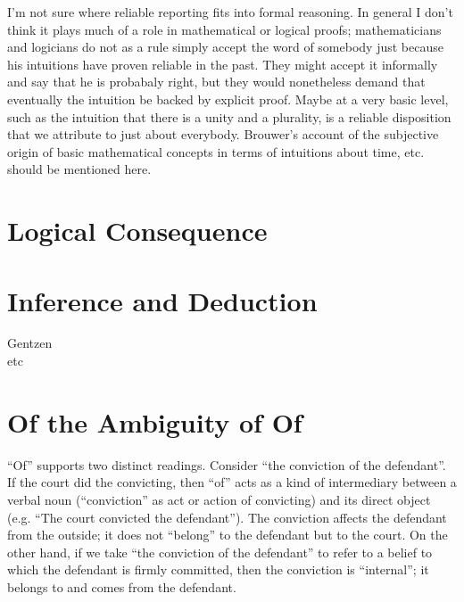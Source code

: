 \begin{ednote}
  I'm not sure where reliable reporting fits into formal reasoning.
  In general I don't think it plays much of a role in mathematical or
  logical proofs; mathematicians and logicians do not as a rule simply
  accept the word of somebody just because his intuitions have proven
  reliable in the past.  They might accept it informally and say that
  he is probabaly right, but they would nonetheless demand that
  eventually the intuition be backed by explicit proof.  Maybe at a
  very basic level, such as the intuition that there is a unity and a
  plurality, is a reliable disposition that we attribute to just about
  everybody.  Brouwer's account of the subjective origin of basic
  mathematical concepts in terms of intuitions about time, etc. should
  be mentioned here.
\end{ednote}

\section{Logical Consequence}
\label{subs:logconseq}

\cite{prawitz_logical_2005}

\cite{prawitz_meaning_2006}

\cite{prawitz_inference_2009}

\cite{prawitz_epistemic_2011}

\cite{prawitz_truth_epistemic}

\section{Inference and Deduction}
\label{sect:infdeduc}

\begin{description}
\item [Gentzen]
\item [etc]
\end{description}

\section{Of the Ambiguity of Of}
\label{subs:ofofof}

``Of'' supports two distinct readings.  Consider ``the conviction of
the defendant''.  If the court did the convicting, then ``of'' acts as
a kind of intermediary between a verbal noun (``conviction'' as act or
action of convicting) and its direct object (e.g. ``The court
convicted the defendant'').  The conviction affects the defendant from
the outside; it does not ``belong'' to the defendant but to the court.
On the other hand, if we take ``the conviction of the defendant'' to
refer to a belief to which the defendant is firmly committed, then the
conviction is ``internal''; it belongs to and comes from the
defendant.


